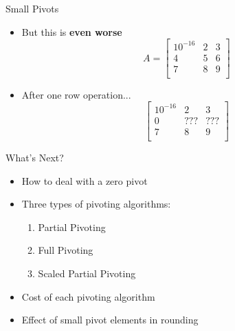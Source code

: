 \documentclass[10pt]{beamer}
\begin{document}

\begin{frame}{Small Pivots}
\begin{itemize}
    \item But this is \textbf{even worse}
    \begin{equation*}
A=
\begin{bmatrix}
  \boxed{10^{-16}} & 2 & 3\\
  4 & 5 & 6\\
  7 & 8 & 9\\
\end{bmatrix}
\end{equation*}
    \item<2> After one row operation... 
        \begin{equation*}
    \begin{bmatrix}
  10^{-16} & 2 & 3\\
  0 & ??? & ???\\
  7 & 8 & 9\\
\end{bmatrix}
\end{equation*}
\end{itemize}
\end{frame}
\begin{frame}{What's Next?}
\begin{itemize}
\item How to deal with a zero pivot  
\vfill

\item Three types of pivoting algorithms: 
\begin{enumerate}
    \item Partial Pivoting
    \item Full Pivoting 
    \item Scaled Partial Pivoting
\end{enumerate}
\vfill

\item Cost of each pivoting algorithm
\vfill

\item Effect of small pivot elements in rounding
\vfill
\end{itemize}
\end{frame}
\end{document}
